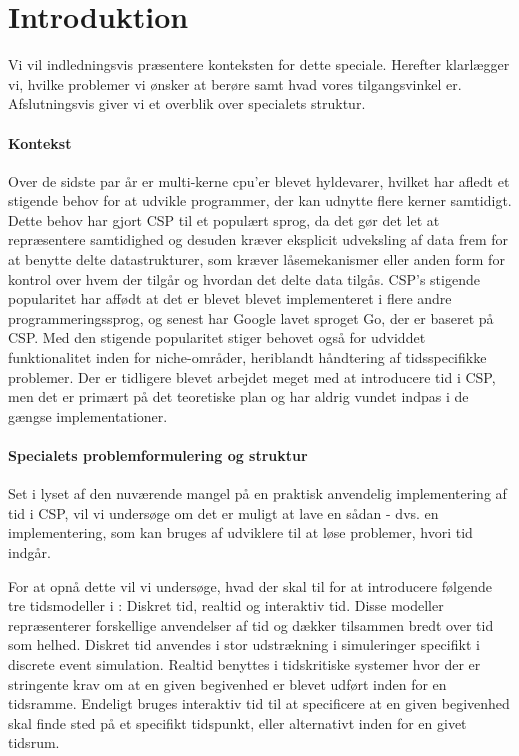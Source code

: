 \chapter{Introduktion}
Vi vil indledningsvis præsentere konteksten for dette speciale. Herefter klarlægger vi, hvilke problemer vi ønsker at berøre samt hvad vores tilgangsvinkel er. Afslutningsvis giver vi et overblik over specialets struktur. 

\subsubsection{Kontekst}
Over de sidste par år er multi-kerne cpu'er blevet hyldevarer, hvilket har afledt et stigende behov for at udvikle programmer, der kan udnytte flere kerner samtidigt. Dette behov har gjort CSP til et populært sprog, da det gør det let at repræsentere samtidighed og desuden kræver eksplicit udveksling af data frem for at benytte delte datastrukturer, som kræver låsemekanismer eller anden form for kontrol over hvem der tilgår og hvordan det delte data tilgås. CSP's stigende popularitet har affødt at det er blevet blevet implementeret i flere andre programmeringssprog, og senest har Google lavet sproget Go, der er baseret på CSP. Med den stigende popularitet stiger behovet også for udviddet funktionalitet inden for niche-områder, heriblandt håndtering af tidsspecifikke problemer. Der er tidligere blevet arbejdet meget med at introducere tid i CSP, men det er primært på det teoretiske plan og har aldrig vundet indpas i de gængse implementationer. 

\subsubsection{Specialets problemformulering og struktur}
Set i lyset af den nuværende mangel på en praktisk anvendelig implementering af tid i CSP, vil vi undersøge om det er muligt at lave en sådan - dvs. en implementering, som kan bruges af udviklere til at løse problemer, hvori tid indgår.

For at opnå dette vil vi undersøge, hvad der skal til for at introducere følgende tre tidsmodeller i \pycsp: Diskret tid, realtid og interaktiv tid. Disse modeller repræsenterer forskellige anvendelser af tid og dækker tilsammen bredt over tid som helhed. Diskret tid anvendes i stor udstrækning i simuleringer specifikt i discrete event simulation. Realtid benyttes i tidskritiske systemer hvor der er stringente krav om at en given begivenhed er blevet udført inden for en tidsramme. Endeligt bruges interaktiv tid til at specificere at en given begivenhed skal finde sted på et specifikt tidspunkt, eller alternativt inden for en givet tidsrum. 

